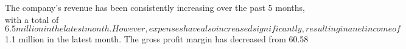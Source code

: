 The company's revenue has been consistently increasing over the past 5 months, with a total of $6.5 million in the latest month. However, expenses have also increased significantly, resulting in a net income of $1.1 million in the latest month. The gross profit margin has decreased from 60.58%